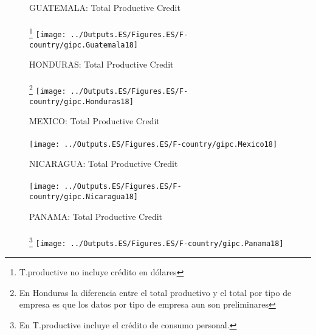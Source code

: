 \documentclass{beamer}
\begin{document}
\begin{frame}
	
	\begin{figure}
		\centering
		GUATEMALA: Total Productive Credit\\~\\
		\footnote{T.productive no incluye crédito en dólares}
		\texttt{[image: ../Outputs.ES/Figures.ES/F-country/gipc.Guatemala18]}
	\end{figure}
\end{frame}
%
\begin{frame}
	
	\begin{figure}
		\centering
		HONDURAS: Total Productive Credit\\~\\
		\footnote{En Honduras la diferencia entre el total productivo y el total por tipo de empresa es que los datos por tipo de empresa aun son preliminares}
		\texttt{[image: ../Outputs.ES/Figures.ES/F-country/gipc.Honduras18]}
	\end{figure}
\end{frame}
%
\begin{frame}
	
	\begin{figure}
		\centering
		MEXICO: Total Productive Credit\\~\\
		\texttt{[image: ../Outputs.ES/Figures.ES/F-country/gipc.Mexico18]}
	\end{figure}
\end{frame}
%
\begin{frame}
	
	\begin{figure}
		\centering
		NICARAGUA: Total Productive Credit\\~\\
		\texttt{[image: ../Outputs.ES/Figures.ES/F-country/gipc.Nicaragua18]}
\end{figure}
\end{frame}
%
\begin{frame}
	
	\begin{figure}
		\centering
		PANAMA: Total Productive Credit\\~\\
		\footnote{En T.productive incluye el crédito de consumo personal.}
		\texttt{[image: ../Outputs.ES/Figures.ES/F-country/gipc.Panama18]}
	\end{figure}
\end{frame}
\end{document}
